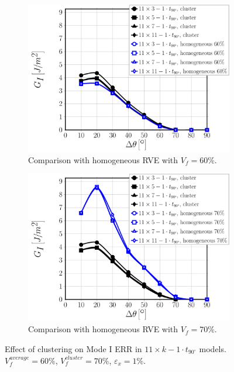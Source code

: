 \documentclass[review]{elsarticle}
\begin{document}
\begin{figure}[!h]
\centering
    \begin{subfigure}[b]{0.475\textwidth}
        \includegraphics[width=\textwidth]{11xk-1t90-vf60-GI.pdf}
        \caption{Comparison with homogeneous RVE with $V_{f}=60\%$.}\label{subfig:cluster1t9011xkModeI60}
    \end{subfigure}\quad
    \begin{subfigure}[b]{0.475\textwidth}
        \includegraphics[width=\textwidth]{11xk-1t90-vf70-GI.pdf}
        \caption{Comparison with homogeneous RVE with $V_{f}=70\%$.}\label{subfig:cluster1t9011xkModeI70}
    \end{subfigure}

\caption{Effect of clustering on Mode I ERR in $11\times k-1\cdot t_{90^{\circ}}$ models. $V^{average}_{f}=60\%$, $V^{cluster}_{f}=70\%$, $\varepsilon_{x}=1\%$.}\label{fig:cluster1t9011xkModeI}
\end{figure}
\end{document}
